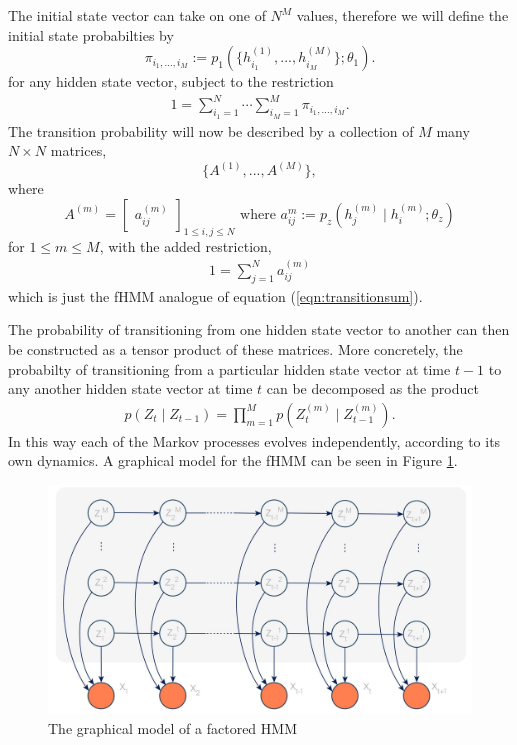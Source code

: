 \documentclass{amsart}
\begin{document}
The initial state vector can take on one of $N^M$ values, therefore we will define the initial state probabilties by 
\[
\pi_{i_1,...,i_M} := p_1(\{h_{i_1}^{(1)},...,h_{i_M}^{(M)}\};\theta_1).
\] 
for any hidden state vector, subject to the restriction
\begin{eqnarray}\label{eqn:initialstate}
1 = \sum_{i_1=1}^N\cdots \sum_{i_M=1}^M \pi_{i_1,...,i_M}.
\end{eqnarray}
The transition probability will now be described by a collection of $M$ many $N\times N$ matrices, 
\[
\{A^{(1)},...,A^{(M)}\},
\]
where 
\[
A^{(m)} = \begin{bmatrix}
a_{ij}^{(m)}
\end{bmatrix}_{1\leq i,j\leq N}\text{ where } a_{ij}^m := p_z(h_j^{(m)}\mid 
h_i^{(m)}; \theta_z)
\]
for $1\leq m\leq M$, with the added restriction,
\begin{eqnarray}\label{eqn:transitionsum2}
1=\sum_{j=1}^Na_{ij}^{(m)}
\end{eqnarray}
which is just the fHMM analogue of equation (\ref{eqn:transitionsum}).

The probability of transitioning from one hidden state vector to another can 
then be constructed as a tensor product of these matrices.  More concretely, 
the probabilty of transitioning from a particular hidden state vector at time 
$t-1$ to any another hidden state vector at time $t$ can be decomposed as the product
\begin{eqnarray}\label{eqn:trans2}
p(Z_t\mid Z_{t-1}) = \prod_{m=1}^M p(Z_{t}^{(m)} \mid Z_{t-1}^{(m)}).
\end{eqnarray}
In this way each of the Markov processes evolves independently, according to 
its own dynamics. A graphical model for the fHMM can be seen in Figure 
\ref{fig:fHMM}.

\begin{figure}
\centering
\includegraphics[scale=0.1]{figures/fhmm.jpg}
\caption{The graphical model of a factored HMM}\label{fig:fHMM}
\end{figure}
\end{document}
